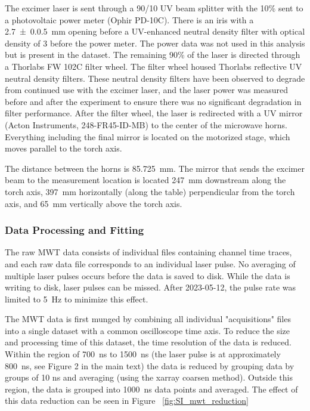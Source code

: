 The excimer laser is sent through a 90/10 UV beam splitter with the 10\% sent to a photovoltaic power meter (Ophir PD-10C). There is an iris with a \SI{2.7(0.05)} {\milli\meter}  opening before a UV-enhanced neutral density filter with optical density of 3 before the power meter. The power data was not used in this analysis but is present in the dataset. The remaining 90\% of the laser is directed through a Thorlabs FW 102C filter wheel. The filter wheel housed Thorlabs reflective UV neutral density filters. These neutral density filters have been observed to degrade from continued use with the excimer laser, and the laser power was measured before and after the experiment to ensure there was no significant degradation in filter performance. After the filter wheel, the laser is redirected with a UV mirror (Acton Instruments, 248-FR45-ID-MB) to the center of the microwave horns. Everything including the final mirror is located on the motorized stage, which moves parallel to the torch axis. 

The distance between the horns is \SI{85.725} {\milli\meter}. The mirror that sends the excimer beam to the measurement location is located \SI{247} {\milli\meter} downstream along the torch axis, \SI{397} {\milli\meter} horizontally (along the table) perpendicular from the torch axis, and \SI{65} {\milli\meter} vertically above the torch axis. 


\subsubsection{Data Processing and Fitting}

The raw MWT data consists of individual files containing channel time traces, and each raw data file corresponds to an individual laser pulse. No averaging of multiple laser pulses occurs before the data is saved to disk. While the data is writing to disk, laser pulses can be missed. After 2023-05-12, the pulse rate was limited to \SI{5} {\hertz} to minimize this effect. 

The MWT data is first munged by combining all individual "acquisitions" files into a single dataset with a common oscilloscope time axis. To reduce the size and processing time of this dataset, the time resolution of the data is reduced. Within the region of \SI{700} {\nano\second} to \SI{1500} {\nano\second} (the laser pulse is at approximately \SI{800} {\nano\second}, see Figure 2 in the main text) the data is reduced by grouping data by groups of 10 ns and averaging (using the xarray coarsen method). Outside this region, the data is grouped into \SI{1000} {\nano\second} data points and averaged. The effect of this data reduction can be seen in Figure \ \ref{fig:SI_mwt_reduction}

